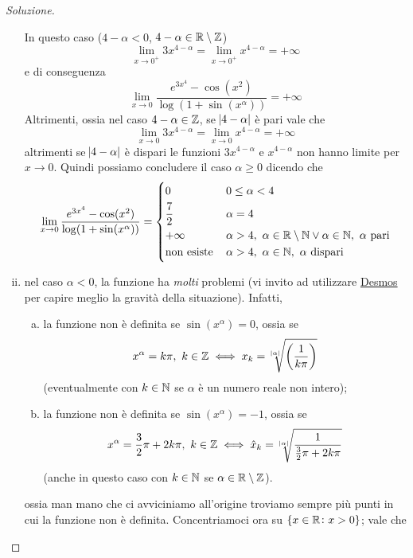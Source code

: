 \begin{proof}[Soluzione]
\begin{enumerate}[(i)]
        In questo caso ($4-\alpha<0$, $4-\alpha\in\amsbb{R}\setminus \amsbb{Z}$)
        \[
        \lim_{x\to 0^+} 3x^{4-\alpha} = \lim_{x\to 0^+} x^{4-\alpha} = +\infty
        \]
        e di conseguenza
        \[
        \lim_{x\to 0} \frac{e^{3x^4}-\cos(x^2)}{\log(1+\sin(x^\alpha))} = +\infty
        \]
        Altrimenti, ossia nel caso $4-\alpha\in\amsbb{Z}$, se $\abs{4-\alpha}$ è pari vale che
        \[
        \lim_{x\to 0} 3x^{4-\alpha} = \lim_{x\to 0} x^{4-\alpha} = +\infty
        \]
        altrimenti se $\abs{4-\alpha}$ è dispari le funzioni $3x^{4-\alpha}$ e $x^{4-\alpha}$ non hanno limite per $x\to 0$. Quindi possiamo concludere il caso $\alpha\ge 0$ dicendo che
        \[
        \lim_{x\to 0} \frac{e^{3x^4}-\cos(x^2)}{\log(1+\sin(x^\alpha))} = \begin{dcases}
            0\, & 0\le \alpha<4\\
            \frac{7}{2}\, & \alpha=4 \\
            +\infty\, & \alpha>4, \ \alpha\in\amsbb{R}\setminus \amsbb{N} \lor \alpha\in\amsbb{N}, \ \alpha \ \text{pari} \\
            \text{non esiste}\, & \alpha>4, \ \alpha\in\amsbb{N}, \ \alpha \ \text{dispari} 
        \end{dcases}
        \]
        \item nel caso $\alpha<0$, la funzione ha \emph{molti} problemi (vi invito ad utilizzare \href{https://www.desmos.com/calculator}{Desmos} per capire meglio la gravità della situazione).
        Infatti,
        \begin{enumerate}[(a)]
            \item la funzione non è definita se $\sin(x^\alpha) = 0$, ossia se 
            \[
            x^{\alpha} = k\pi, \ k\in\amsbb{Z} \iff x_k = \sqrt[\abs{\alpha}]{\left(\frac{1}{k\pi}\right)}
            \]
            (eventualmente con $k\in\amsbb{N}$ se $\alpha$ è un numero reale non intero);
            \item la funzione non è definita se $\sin(x^\alpha)=-1$, ossia se
            \[
            x^\alpha = \frac{3}{2}\pi + 2k\pi, \ k\in\amsbb{Z} \iff \hat{x}_k =\sqrt[\abs{\alpha}]{\frac{1}{\frac{3}{2}\pi + 2k\pi}}
            \]
            (anche in questo caso con $k\in\amsbb{N}$ se $\alpha\in\amsbb{R}\setminus \amsbb{Z}$).
        \end{enumerate}
        ossia man mano che ci avviciniamo all'origine troviamo sempre più punti in cui la funzione non è definita. Concentriamoci ora su $\{x\in\amsbb{R}\colon x>0\}$; vale che

\end{enumerate}
\end{proof}
